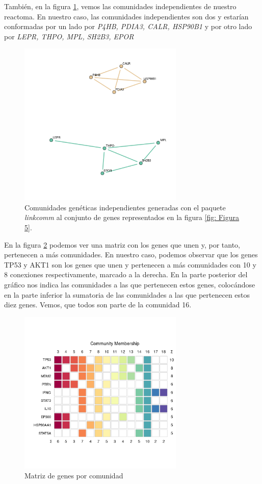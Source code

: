 También, en la figura \ref{fig: Figura6}, vemos las comunidades independientes de nuestro reactoma. En nuestro caso, las comunidades independientes son dos y estarían conformadas por un lado por \textit{P4HB, PDIA3, CALR, HSP90B1} y por otro lado por \textit{LEPR, THPO, MPL, SH2B3, EPOR}
\begin{figure}[h]
	\centering
	\includegraphics[width=0.70\textwidth]{figures/05_Comunidades_Independientes.png}
	\caption{Comunidades genéticas independientes generadas con el paquete \textit{linkcomm} al conjunto de genes representados en la figura  \ref{fig: Figura 5}.}
	\label{fig: Figura6}
\end{figure}

En la figura \ref{fig: Figura 7} podemos ver una matriz con los genes que unen y, por tanto, pertenecen a más comunidades. En nuestro caso, podemos observar que los genes TP53 y AKT1 son los genes que unen y pertenecen a más comunidades con 10 y 8 conexiones respectivamente, marcado a la derecha. En la parte posterior del gráfico nos indica las comunidades a las que pertenecen estos genes, colocándose en la parte inferior la sumatoria de las comunidades a las que pertenecen estos diez genes. Vemos, que todos son parte de la comunidad 16.

\begin{figure}[h]
	\centering
	\includegraphics[width=0.70\textwidth]{figures/03_GenesMasCOnectadosOtrasComunidades.png}
	\caption{Matriz de genes por comunidad}
	\label{fig: Figura 7}
\end{figure}

